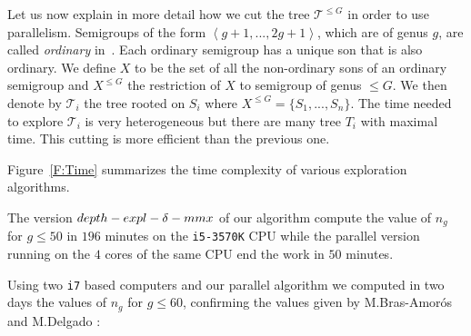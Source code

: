 \documentclass[reqno,11pt]{amsart}
\theoremstyle{plain}
\theoremstyle{definition}
\renewcommand{\leq}{\leqslant}
\renewcommand{\tt}[1]{\texttt{#1}}
\begin{document}
Let us now explain in more detail how we cut the tree $\mathcal{T}^{\leq G}$ in order to use parallelism.
Semigroups of the form $\left<g+1,...,2g+1\right>$, which are of genus $g$, are called \emph{ordinary} in~\cite{Elizalde}. 
Each ordinary semigroup has a unique son that is also ordinary. 
We define $X$ to be the set of all the non-ordinary sons of an ordinary semigroup and $X^{\leq G}$ the restriction of $X$ to semigroup of genus $\leq G$. 
We then denote by  $\mathcal{T}_i$ the tree rooted on $S_i$ where $X^{\leq G}=\{S_1,...,S_n\}$. 
The time needed to explore $\mathcal{T}_i$ is very heterogeneous but there are many tree $T_i$ with maximal time. 
This cutting is more efficient than the previous one.

Figure~\ref{F:Time} summarizes the time complexity of various exploration algorithms.

The version $\small depth-expl-\delta-mmx$ of our algorithm compute the value of $n_g$ for $g\leq 50$ in $196$ minutes on the \tt{i5-3570K} CPU while the parallel version running on the $4$ cores of the same CPU end the work in $50$ minutes.

Using two \tt{i7} based computers and our  parallel algorithm  we computed in two days the values of $n_g$ for $g\leq 60$, confirming the values given by M.Bras-Amor\'os and M.Delgado : 
\end{document}
